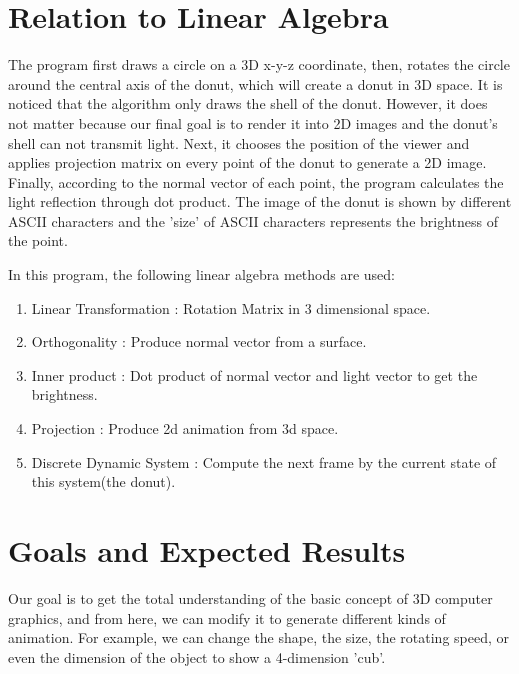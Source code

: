 \documentclass{article}
\begin{document}
\section{Relation to Linear Algebra}

\par The program first draws a circle on a 3D x-y-z coordinate, then, rotates the circle around the central axis of the donut, which will create a donut in 3D space.
It is noticed that the algorithm only draws the shell of the donut. 
However, it does not matter because our final goal is to render it into 2D images and the donut's shell can not transmit light. 
Next, it chooses the position of the viewer and applies projection matrix on every point of the donut to generate a 2D image.
Finally, according to the normal vector of each point, the program calculates the light reflection through dot product. 
The image of the donut is shown by different ASCII characters and the 'size' of ASCII characters represents the brightness of the point.

\par In this program, the following linear algebra methods are used:

\begin{enumerate}
  \item Linear Transformation : Rotation Matrix in 3 dimensional space.
  \item Orthogonality : Produce normal vector from a surface.
  \item Inner product : Dot product of normal vector and light vector to get the brightness.
  \item Projection : Produce 2d animation from 3d space.
  \item Discrete Dynamic System : Compute the next frame by the current state of this system(the donut).
\end{enumerate}

\section{Goals and Expected Results}

\par Our goal is to get the total understanding of the basic concept of 3D computer graphics, and from here, we can modify it to generate different kinds of animation. 
For example, we can change the shape, the size, the rotating speed, or even the dimension of the object to show a 4-dimension 'cub'.
\end{document}
